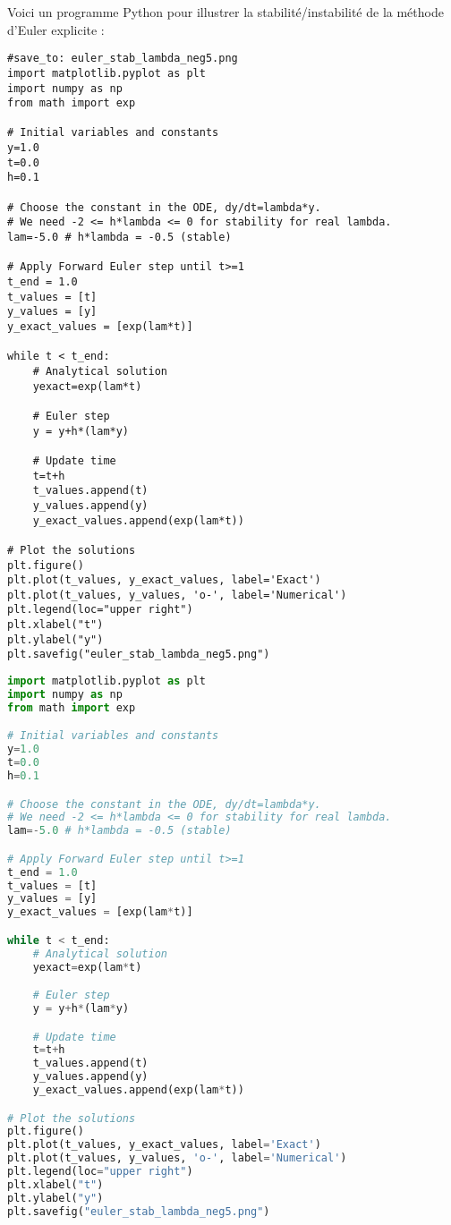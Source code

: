 \documentclass{article}
\begin{document}
Voici un programme Python pour illustrer la stabilité/instabilité de la méthode d'Euler explicite :
\begin{verbatim}
#save_to: euler_stab_lambda_neg5.png
import matplotlib.pyplot as plt
import numpy as np
from math import exp

# Initial variables and constants
y=1.0
t=0.0
h=0.1

# Choose the constant in the ODE, dy/dt=lambda*y.
# We need -2 <= h*lambda <= 0 for stability for real lambda.
lam=-5.0 # h*lambda = -0.5 (stable)

# Apply Forward Euler step until t>=1
t_end = 1.0
t_values = [t]
y_values = [y]
y_exact_values = [exp(lam*t)]

while t < t_end:
    # Analytical solution
    yexact=exp(lam*t)

    # Euler step
    y = y+h*(lam*y)

    # Update time
    t=t+h
    t_values.append(t)
    y_values.append(y)
    y_exact_values.append(exp(lam*t))

# Plot the solutions
plt.figure()
plt.plot(t_values, y_exact_values, label='Exact')
plt.plot(t_values, y_values, 'o-', label='Numerical')
plt.legend(loc="upper right")
plt.xlabel("t")
plt.ylabel("y")
plt.savefig("euler_stab_lambda_neg5.png")
\end{verbatim}
\begin{lstlisting}[language=Python, caption=Code Python pour Euler Explicite stable, label=code:euler_stab_neg5]
import matplotlib.pyplot as plt
import numpy as np
from math import exp

# Initial variables and constants
y=1.0
t=0.0
h=0.1

# Choose the constant in the ODE, dy/dt=lambda*y.
# We need -2 <= h*lambda <= 0 for stability for real lambda.
lam=-5.0 # h*lambda = -0.5 (stable)

# Apply Forward Euler step until t>=1
t_end = 1.0
t_values = [t]
y_values = [y]
y_exact_values = [exp(lam*t)]

while t < t_end:
    # Analytical solution
    yexact=exp(lam*t)

    # Euler step
    y = y+h*(lam*y)

    # Update time
    t=t+h
    t_values.append(t)
    y_values.append(y)
    y_exact_values.append(exp(lam*t))

# Plot the solutions
plt.figure()
plt.plot(t_values, y_exact_values, label='Exact')
plt.plot(t_values, y_values, 'o-', label='Numerical')
plt.legend(loc="upper right")
plt.xlabel("t")
plt.ylabel("y")
plt.savefig("euler_stab_lambda_neg5.png")
\end{lstlisting}
\end{document}
